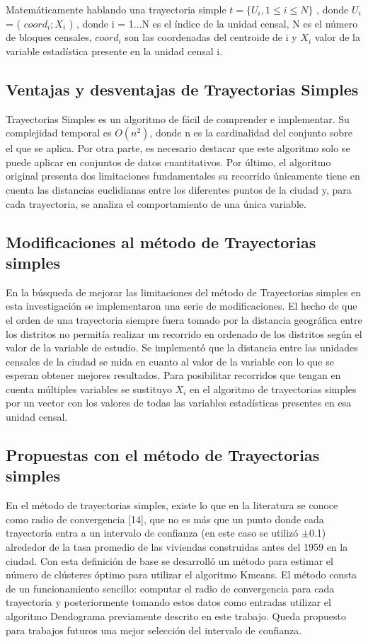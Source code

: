 Matemáticamente hablando una trayectoria simple $t= \{ U_i,1 \leq i \leq N \} $ , donde $U_i$ = ( $coord_i; X_i$  ) , donde i = 1...N es el índice de la unidad censal, N es el número de bloques censales, $coord_i$ son las coordenadas del centroide de i y $X_i$ valor de la variable estadística presente en la unidad censal  i. 

\subsection{Ventajas y desventajas de Trayectorias Simples}
Trayectorias Simples es un algoritmo de fácil de comprender e implementar. Su complejidad temporal es $O(n^2)$, donde n es la cardinalidad del conjunto sobre el que se aplica. Por otra parte, es necesario destacar que este algoritmo solo se puede aplicar en conjuntos de datos cuantitativos. Por último, el algoritmo original presenta dos limitaciones fundamentales   su recorrido únicamente tiene en cuenta las distancias euclidianas entre los diferentes puntos de la ciudad y, para cada trayectoria, se analiza el comportamiento de una única variable. 
\subsection{Modificaciones al método de Trayectorias simples}
En la búsqueda de mejorar las limitaciones del método de Trayectorias simples en esta investigación se implementaron una serie de modificaciones. El hecho de que el orden de una trayectoria siempre fuera tomado por la distancia geográfica entre los distritos no permitía realizar un recorrido en ordenado de los distritos según el valor de la variable de estudio. Se implementó que la distancia entre las unidades censales de la ciudad se mida en cuanto al valor de la variable con lo que se esperan obtener mejores resultados. Para posibilitar recorridos que tengan en cuenta múltiples variables se sustituyo $X_i$ en el algoritmo de trayectorias simples por un vector con los valores de todas las variables estadísticas presentes en esa unidad censal.
\subsection{Propuestas con el método de Trayectorias simples}
En el método de trayectorias simples, existe lo que en la literatura se conoce como radio de convergencia [14], que no es más que un punto donde cada trayectoria entra a un intervalo de confianza (en este caso se utilizó $\pm$0.1) alrededor de la tasa promedio de las viviendas construidas antes del 1959 en la ciudad. Con esta definición de base se desarrolló un método para estimar el número de clústeres óptimo para utilizar el algoritmo Kmeans. El método consta de un funcionamiento sencillo: computar el radio de convergencia para cada trayectoria y posteriormente tomando estos datos como entradas utilizar el algoritmo Dendograma previamente descrito en este trabajo. Queda propuesto para trabajos futuros una mejor selección del intervalo de confianza.
